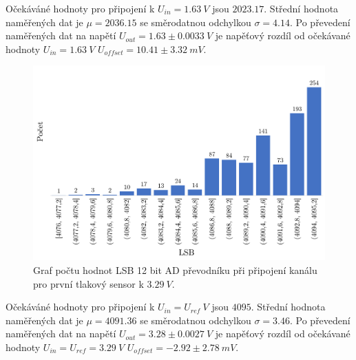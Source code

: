Očekáváné hodnoty pro připojení k $U_{in} = 1.63 \ V$ jsou $2023.17$. Střední hodnota naměřených dat je $\mu = 2036.15$ se směrodatnou odchylkou $\sigma = 4.14$. Po převedení naměřených dat na napětí $U_{out} = 1.63 \pm 0.0033 \ V$ je napěťový rozdíl od očekávané hodnoty $U_{in} = 1.63 \ V$
$U_{offset} = 10.41 \pm 3.32 \ mV$.

\begin{figure}[H]
    \caption{Graf počtu hodnot LSB 12 bit AD převodníku při připojení kanálu pro první tlakový sensor k $3.29 \ V$.}
    \label{fig:hist_vacuum1_3_3}
    \includegraphics[width=1\textwidth]{graphs/vacuum1_33.png}
\end{figure}

Očekáváné hodnoty pro připojení k $U_{in} = U_{ref} \ V$ jsou $4095$. Střední hodnota naměřených dat je $\mu = 4091.36$ se směrodatnou odchylkou $\sigma = 3.46$. Po převedení naměřených dat na napětí $U_{out} = 3.28 \pm 0.0027 \ V$ je napěťový rozdíl od očekávané hodnoty $U_{in} = U_{ref} = 3.29 \ V$
$U_{offset} = -2.92 \pm 2.78 \ mV$.



